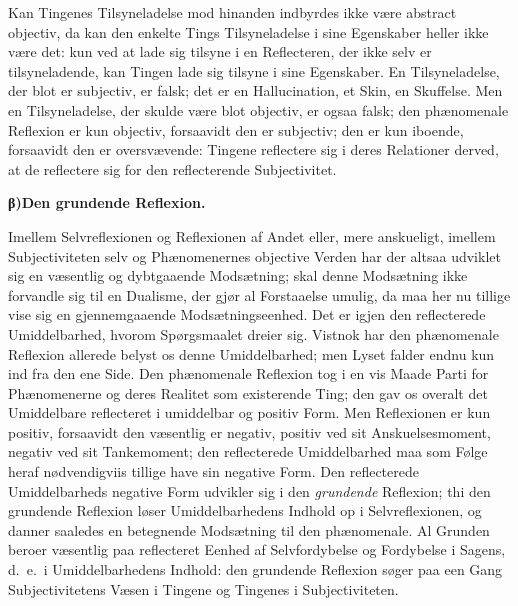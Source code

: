 \documentclass[12pt]{book}
\newcommand{\opage}[1]{\marginnote{\footnotesize\textit{[#1]}}}
\begin{document}
Kan Tingenes Tilsyneladelse mod hinanden indbyrdes ikke være abstract objectiv, da
kan den enkelte Tings Tilsyneladelse i sine Egenskaber heller ikke være det: kun ved
at lade sig tilsyne i en Reflecteren, der ikke selv er tilsyneladende, kan Tingen
lade sig tilsyne i sine Egenskaber. En Tilsyneladelse, der blot er subjectiv, er
falsk; det er en Hallucination, et Skin, en Skuffelse. Men en Tilsyneladelse, der
skulde
\opage{85} være blot objectiv, er ogsaa falsk; den phænomenale Reflexion er kun objectiv,
forsaavidt den er subjectiv; den er kun iboende, forsaavidt den er oversvævende:
Tingene reflectere sig i deres Relationer derved, at de reflectere sig for den
reflecterende Subjectivitet.

\begin{center}{\bfseries β)\quad Den grundende Reflexion.}\end{center}

Imellem Selvreflexionen og Reflexionen af Andet eller, mere anskueligt, imellem
Subjectiviteten selv og Phænomenernes objective Verden har der altsaa udviklet sig en
væsentlig og dybtgaaende Modsætning; skal denne Modsætning ikke forvandle sig til en
Dualisme, der gjør al Forstaaelse umulig, da maa her nu tillige vise sig en
gjennemgaaende Modsætningseenhed. Det er igjen den reflecterede Umiddelbarhed, hvorom
Spørgsmaalet dreier sig. Vistnok har den phænomenale Reflexion allerede belyst os
denne Umiddelbarhed; men Lyset falder endnu kun ind fra den ene Side. Den phænomenale
Reflexion tog i en vis Maade Parti for Phænomenerne og deres Realitet som existerende
Ting; den gav os overalt det Umiddelbare reflecteret i umiddelbar og positiv Form.
Men Reflexionen er kun positiv, forsaavidt den væsentlig er negativ, positiv ved sit
Anskuelsesmoment, negativ ved sit Tankemoment; den reflecterede Umiddelbarhed maa som
Følge heraf nødvendigviis tillige have sin negative Form. Den reflecterede
Umiddelbarheds negative Form udvikler sig i den \emph{grundende} Reflexion; thi den
grundende Reflexion løser Umiddelbarhedens Indhold op i Selvreflexionen, og danner
saaledes en betegnende Modsætning til den phænomenale. Al Grunden beroer væsentlig
paa reflecteret Eenhed af Selvfordybelse og Fordybelse i Sagens, d.\ e.\ i
Umiddelbarhedens Indhold: den grundende Reflexion søger paa een Gang Subjectivitetens
Væsen i Tingene og Tingenes i Subjectiviteten.
\end{document}
